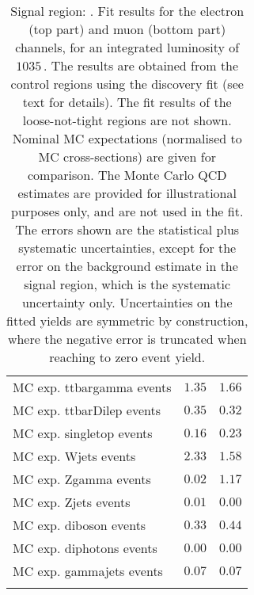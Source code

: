 \begin{table}
\begin{center}
{\begin{tabular*}{\textwidth}{@{\extracolsep{\fill}}lrr}
        MC exp. ttbargamma events         & $1.35$          & $1.66$              \\
        MC exp. ttbarDilep events         & $0.35$          & $0.32$              \\
        MC exp. singletop events         & $0.16$          & $0.23$              \\
        MC exp. Wjets events         & $2.33$          & $1.58$              \\
        MC exp. Zgamma events         & $0.02$          & $1.17$              \\
        MC exp. Zjets events         & $0.01$          & $0.00$              \\
        MC exp. diboson events         & $0.33$          & $0.44$              \\
        MC exp. diphotons events         & $0.00$          & $0.00$              \\
        MC exp. gammajets events         & $0.07$          & $0.07$              \\
\noalign{\smallskip}\hline\noalign{\smallskip}
\end{tabular*}
}
\end{center}
\caption{Signal region: . Fit results for the electron (top part) and muon (bottom part) channels, for an integrated luminosity of $1035$\,\ipb.
The results are obtained from the control regions using the discovery fit (see text for details). The fit results of the loose-not-tight regions are not shown.
Nominal MC expectations (normalised to MC cross-sections) are given for comparison. 
The Monte Carlo QCD estimates are provided for illustrational purposes only, and are not used in the fit.
The errors shown are the statistical plus systematic uncertainties, except for the error on the background estimate in the signal region, which is the systematic uncertainty only.
Uncertainties on the fitted yields are symmetric by construction, 
where the negative error is truncated when reaching to zero event yield.
}
\label{table.results.systematics.in.logL.fit.table.results.yields}
\end{table}
%